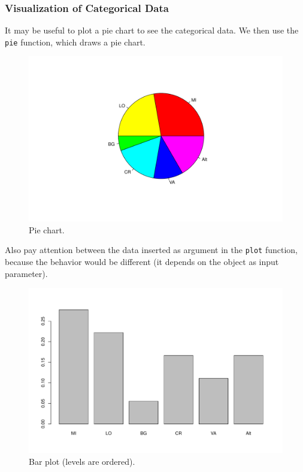 \documentclass[a4paper]{article}
\begin{document}
    \subsubsection{Visualization of Categorical Data}

    It may be useful to plot a pie chart to see the categorical data. We then use the \texttt{pie} function, which draws a pie chart.
    
    \begin{figure}[!htp]
        \centering
        \includegraphics[width=.5\textwidth]{img/visualization-of-categorical-data-1.pdf}
        \caption*{Pie chart.}
    \end{figure}

    \noindent
    Also pay attention between the data inserted as argument in the \texttt{plot} function, because the behavior would be different (it depends on the object as input parameter).
    

    \newpage

    \begin{figure}[!htp]
        \centering
        \includegraphics[width=\textwidth]{img/visualization-of-categorical-data-2.pdf}
        \caption*{Bar plot (levels are ordered).}
    \end{figure}
\end{document}
